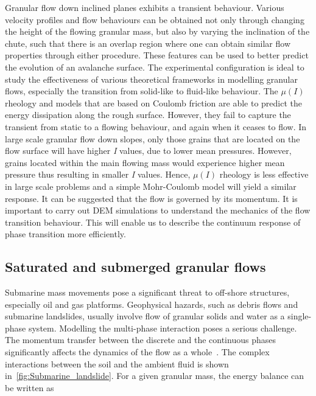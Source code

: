 Granular flow down inclined planes exhibits a transient behaviour. Various 
velocity profiles and flow behaviours can be obtained not only through changing 
the height of the flowing granular mass, but also by varying the inclination of 
the chute, such that there is an overlap region where one can obtain similar 
flow properties through either procedure. These features can be used to better 
predict the evolution of an avalanche surface. The experimental configuration 
is ideal to study the effectiveness of various theoretical frameworks in 
modelling granular flows, especially the transition from solid-like to 
fluid-like behaviour. The $\mu(I)$ rheology and models 
that are based on Coulomb friction are able to predict the energy dissipation 
along the rough surface. However, they fail to capture the transient from 
static to a flowing behaviour, and again when it ceases to flow. 
In large scale granular flow down slopes, only those grains that are
located on the flow surface will have higher \textit{I} values, due to lower 
mean pressures. However, grains located within the main flowing mass would 
experience higher mean pressure thus resulting in smaller \textit{I} 
values. Hence, $\mu(I)$ rheology is less effective in large scale problems and 
a simple Mohr-Coulomb model will yield a similar response. It can be 
suggested that the flow is governed by its momentum. It is 
important to carry out DEM simulations to understand the mechanics of the flow 
transition behaviour. This will enable us to describe the continuum response of 
phase transition more efficiently.

\subsection{Saturated and submerged granular flows}
Submarine mass movements pose a significant threat to off-shore structures, 
especially oil and gas platforms. Geophysical hazards, such as debris flows and 
submarine landslides, usually involve flow of granular solids and water as a 
single-phase system. Modelling the multi-phase interaction poses a serious 
challenge. The momentum transfer between the discrete and the continuous phases 
significantly affects the dynamics of the flow as a whole~\citep{Topin2011}. 
The complex interactions between the soil and the ambient fluid is shown 
in~\cref{fig:Submarine_landslide}. For a given granular mass, the energy 
balance can be written as
%

